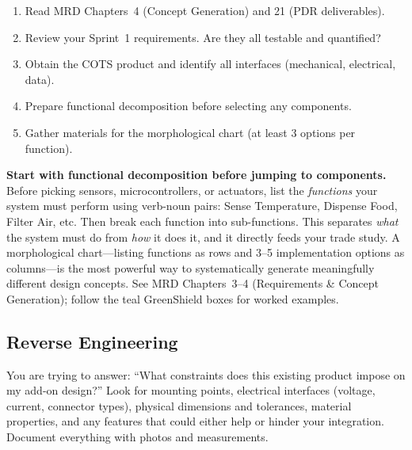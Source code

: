 \documentclass[11pt,letterpaper]{article}
\begin{document}
\begin{checklistbox}
\begin{enumerate}[leftmargin=*, itemsep=1pt, topsep=0pt]
    \item Read MRD Chapters~4 (Concept Generation) and 21 (PDR deliverables).
    \item Review your Sprint~1 requirements. Are they all testable and quantified?
    \item Obtain the COTS product and identify all interfaces (mechanical, electrical, data).
    \item Prepare functional decomposition before selecting any components.
    \item Gather materials for the morphological chart (at least 3 options per function).
\end{enumerate}
\end{checklistbox}

\begin{protip}
\textbf{Start with functional decomposition before jumping to components.} Before picking sensors, microcontrollers, or actuators, list the \textit{functions} your system must perform using verb-noun pairs: Sense Temperature, Dispense Food, Filter Air, etc. Then break each function into sub-functions. This separates \textit{what} the system must do from \textit{how} it does it, and it directly feeds your trade study. A morphological chart---listing functions as rows and 3--5 implementation options as columns---is the most powerful way to systematically generate meaningfully different design concepts. See MRD Chapters~3--4 (Requirements \& Concept Generation); follow the teal GreenShield boxes for worked examples.
\end{protip}

\subsection{Reverse Engineering}

\begin{faqbox}
You are trying to answer: ``What constraints does this existing product impose on my add-on design?'' Look for mounting points, electrical interfaces (voltage, current, connector types), physical dimensions and tolerances, material properties, and any features that could either help or hinder your integration. Document everything with photos and measurements.
\end{faqbox}
\end{document}
